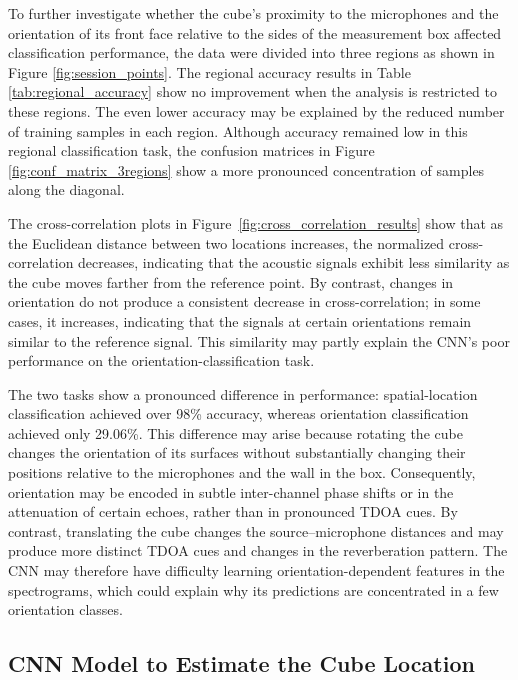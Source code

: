 To further investigate whether the cube's proximity to the microphones and the orientation of its front face relative to the sides of the measurement box affected classification performance, the data were divided into three regions as shown in Figure \ref{fig:session_points}. The regional accuracy results in Table \ref{tab:regional_accuracy} show no improvement when the analysis is restricted to these regions. The even lower accuracy may be explained by the reduced number of training samples in each region. Although accuracy remained low in this regional classification task, the confusion matrices in Figure \ref{fig:conf_matrix_3regions} show a more pronounced concentration of samples along the diagonal.

The cross-correlation plots in Figure~\ref{fig:cross_correlation_results} show that as the Euclidean distance between two locations increases, the normalized cross-correlation decreases, indicating that the acoustic signals exhibit less similarity as the cube moves farther from the reference point. By contrast, changes in orientation do not produce a consistent decrease in cross-correlation; in some cases, it increases, indicating that the signals at certain orientations remain similar to the reference signal. This similarity may partly explain the CNN's poor performance on the orientation-classification task.

The two tasks show a pronounced difference in performance: spatial-location classification achieved over 98\% accuracy, whereas orientation classification achieved only 29.06\%. This difference may arise because rotating the cube changes the orientation of its surfaces without substantially changing their positions relative to the microphones and the wall in the box. Consequently, orientation may be encoded in subtle inter-channel phase shifts or in the attenuation of certain echoes, rather than in pronounced TDOA cues. By contrast, translating the cube changes the source–microphone distances and may produce more distinct TDOA cues and changes in the reverberation pattern. The CNN may therefore have difficulty learning orientation-dependent features in the spectrograms, which could explain why its predictions are concentrated in a few orientation classes.

\subsection{CNN Model to Estimate the Cube Location}

